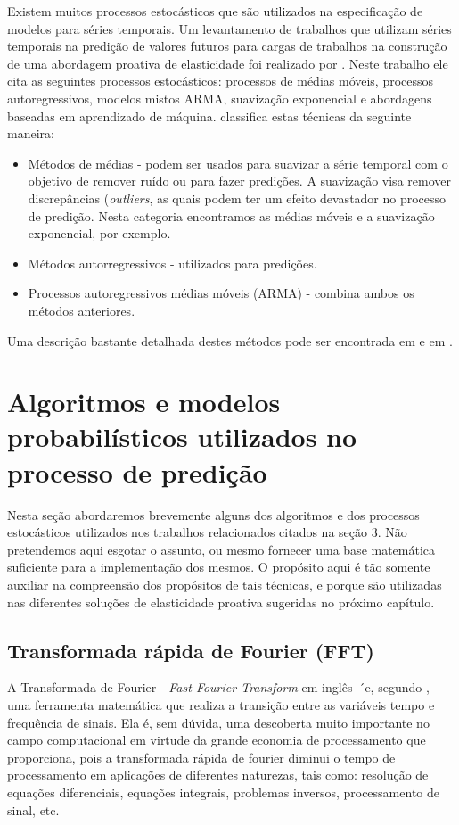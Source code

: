 \documentclass[twoside,english,brazilian]{UNISINOSmonografia}
\begin{document}
Existem muitos processos estocásticos que são utilizados na especificação de modelos para séries temporais. Um levantamento de trabalhos que utilizam séries temporais na predição de valores futuros para cargas de trabalhos na construção de uma abordagem proativa de elasticidade foi realizado por \citep{Lorido-botr2012}. Neste trabalho ele cita as seguintes processos estocásticos: processos de médias móveis, processos autoregressivos, modelos mistos ARMA, suavização exponencial e abordagens baseadas em aprendizado de máquina.\citep{Lorido-botr2012} classifica estas técnicas da seguinte maneira:

\begin{itemize}
	\item Métodos de médias - podem ser usados para suavizar a série temporal com o objetivo de remover ruído ou para fazer predições. A suavização visa remover discrepâncias (\textit{outliers}, as quais podem ter um efeito devastador no processo de predição. Nesta categoria encontramos as médias móveis e a suavização exponencial, por exemplo.
	\item Métodos autorregressivos - utilizados para predições. %
	\item Processos autoregressivos médias móveis (ARMA) - combina ambos os métodos anteriores.
\end{itemize}
Uma descrição bastante detalhada destes métodos pode ser encontrada em \cite{Lee2009} e em \cite{Shumway2000}.

\section{Algoritmos e modelos probabilísticos utilizados no processo de predição}
Nesta seção abordaremos brevemente alguns dos algoritmos e dos processos estocásticos utilizados nos trabalhos relacionados citados na seção 3. Não pretendemos aqui esgotar o assunto, ou mesmo fornecer uma base matemática suficiente para a implementação dos mesmos. O propósito aqui é tão somente auxiliar na compreensão dos propósitos de tais técnicas, e porque são utilizadas nas diferentes soluções de elasticidade proativa sugeridas no próximo capítulo.

\subsection{Transformada rápida de Fourier (FFT)}
A Transformada de Fourier - \textit{Fast Fourier Transform} em inglês - ́e, segundo \cite{Goncalves2004}, uma ferramenta matemática que realiza a transição entre as variáveis tempo e frequência de sinais. Ela é, sem dúvida, uma descoberta muito importante no campo computacional em virtude da grande economia de processamento que proporciona, pois a transformada rápida de fourier diminui o tempo de processamento em aplicações de diferentes naturezas, tais como:  resolução de equações diferenciais, equações integrais, problemas inversos, processamento de sinal, etc.
\end{document}
